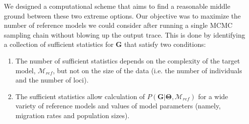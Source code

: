 \documentclass[11pt]{article}
\newcommand{\vect}[1]{\boldsymbol{\mathbf{#1}}}
\newcommand{\M}{\mathcal{M}}
\newcommand{\G}{\vect{G}}
\newcommand{\T}{\vect{\Theta}}
\newcommand{\Mref}{\M_{ref}}
\newcommand{\1}{\mathbbm{1}}
\begin{document}
We designed a computational scheme that aims to find a reasonable middle ground between these two extreme options.
Our objective was to maximize the number of reference models we could consider after running a single MCMC sampling chain without blowing up the output trace.
This is done by identifying a collection of sufficient statistics for $\G$ that satisfy two conditions:
%
%
\begin{enumerate}
 \item The number of sufficient statistics depends on the complexity of the target model, $\Mref$, but not on the size of the data (i.e. the number of individuals and the number of loci).
 \item The sufficient statistics allow calculation of $P(\G|\T,\Mref)$ for a wide variety of reference models and values of model parameters (namely, migration rates and population sizes).
\end{enumerate}
%
\end{document}
